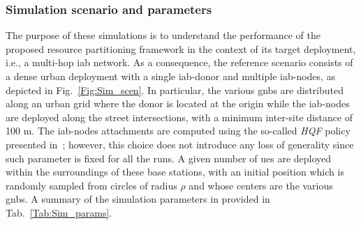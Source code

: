 
\subsubsection{Simulation scenario and parameters}
The purpose of these simulations is to understand the performance of the proposed resource partitioning framework in the context of its target deployment, i.e., a multi-hop \gls{iab} network. As a consequence, the reference scenario consists of a dense urban deployment with a single \gls{iab}-donor and multiple \gls{iab}-nodes, as depicted in Fig.~\ref{Fig:Sim_scen}. In particular, the various \glspl{gnb} are distributed along an urban grid where the donor is located at the origin while the \gls{iab}-nodes are deployed along the street intersections, with a minimum inter-site distance of 100 m. The \gls{iab}-nodes attachments are computed using the so-called \textit{HQF} policy presented in~\cite{polese2018iab}; however, this choice does not introduce any loss of generality since such parameter is fixed for all the runs. A given number of \glspl{ue} are deployed within the surroundings of these base stations, with an initial position which is randomly sampled from circles of radius $\rho$ and whose centers are the various \glspl{gnb}. A summary of the simulation parameters in provided in Tab.~\ref{Tab:Sim_params}.

